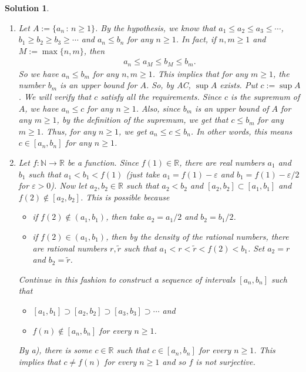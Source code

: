 \documentclass[12pt]{article}
\newcommand{\bR}{\mathbb{R}}
\newcommand{\bN}{\mathbb{N}}
\newcommand{\ra}{\rightarrow}
\theoremstyle{plain}
\theoremstyle{plain}
\newtheorem*{sol}{\textbf{Solution}}}
\theoremstyle{plain}
\theoremstyle{plain}
\begin{document}
\begin{sol}
\begin{enumerate}[label=\textbf{\alph*)}]
\item Let $A := \{ a_n \, : \, n \geq 1 \}$. By the hypothesis, we know that $a_1 \leq a_2 \leq a_3 \leq \cdots$, $b_1 \geq b_2 \geq b_3 \geq \cdots$ and $a_n \leq b_n$ for any $n \geq 1$. In fact, if $n, m \geq 1$ and $M := \max \{ n, m \}$, then
	\begin{align*}
	a_n \leq a_M \leq b_M \leq b_m .
	\end{align*}
So we have $a_n \leq b_m$ for any $n, m \geq 1$. This implies that for any $m \geq 1$, the number $b_m$ is an upper bound for $A$. So, by AC, $\sup A$ exists. Put $c := \sup A$. We will verify that $c$ satisfy all the requirements. Since $c$ is the supremum of $A$, we have $a_n \leq c$ for any $n \geq 1$. Also, since $b_m$ is an upper bound of $A$ for any $m \geq 1$, by the definition of the supremum, we get that $c \leq b_m$ for any $m \geq 1$. Thus, for any $n \geq 1$, we get $a_n \leq c \leq b_n$. In other words, this means $c \in [a_n , b_n]$ for any $n \geq 1$.
\item Let $f : \bN \ra \bR$ be a function. Since $f(1) \in \bR$, there are real numbers $a_1$ and $b_1$ such that $a_1 < b_1 < f(1)$ (just take $a_1 = f(1) - \varepsilon$ and $b_1 = f(1) - \varepsilon/2$ for $\varepsilon > 0$). Now let $a_2, b_2 \in \bR$ such that $a_2 < b_2$ and $[a_2, b_2] \subset [a_1 , b_1]$ and $f(2) \not\in [a_2 , b_2]$. This is possible because
	\begin{itemize}
	\item if $f(2) \not\in (a_1 , b_1)$, then take $a_2 = a_1/2$ and $b_2 = b_1/2$.
	\item if $f(2) \in (a_1 , b_1)$, then by the density of the rational numbers, there are rational numbers $r, \tilde{r}$ such that $a_1 < r < \tilde{r} < f(2) < b_1$. Set $a_2 = r$ and $b_2 = \tilde{r}$.
	\end{itemize}
Continue in this fashion to construct a sequence of intervals $[a_n , b_n]$ such that 
	\begin{itemize}
	\item $[a_1 , b_1] \supset [a_2 , b_2] \supset [a_3, b_3] \supset \cdots$ and
	\item $f(n) \not\in [a_n , b_n]$ for every $n \geq 1$.
	\end{itemize}
By a), there is some $c \in \bR$ such that $c \in [a_n , b_n ]$ for every $n \geq 1$. This implies that $c \neq f(n)$ for every $n \geq 1$ and so $f$ is not surjective.
\end{enumerate}
\end{sol}
\end{document}
